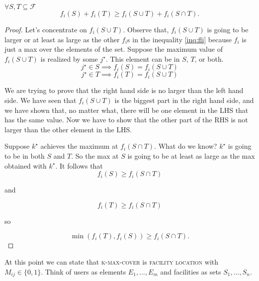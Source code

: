 \begin{claim}
 $\forall S, T \subseteq \mathcal{F}$
\begin{equation}\label{inq:fli}
f_i(S) + f_i(T) \geq f_i(S \cup T) + f_i(S \cap T).
\end{equation}	
\end{claim}
\begin{proof}
	Let's concentrate on $f_i(S \cup T)$. Observe that, $f_i(S \cup T)$ is going to be larger or at least as large as the other $f_i$s in the inequality \ref{inq:fli}  because $f_i$ is just a max over the elements of the set. Suppose the maximum value of $f_i(S \cup T)$ is realized by some $j^\star$. This element can be in $S$, $T$, or both.
	\begin{equation}
	j^\star\in S \implies f_i(S) = f_i(S \cup T)
	\end{equation}
\begin{equation}j^\star\in T \implies f_i(T) = f_i(S \cup T)\end{equation}

We are trying to prove that the right hand side is no larger than the left hand side. We have seen that $f_i(S \cup T)$ is the biggest part in the right hand side, and we have shown that, no matter what, there will be one element in the LHS that has the same value. Now we have to show that the other part of the RHS is not larger than the other element in the LHS.

Suppose $k^\star$ achieves the maximum at $f_i(S \cap T)$. What do we know? $k^\star$ is going to be in both $S$ and $T$. So the max at $S$ is going to be at least as large as the max obtained with $k^\star$. It follows that
\begin{equation}
 f_i(S) \geq f_i(S \cap T)
\end{equation}

and

\begin{equation}
f_i(T) \geq f_i(S \cap T)
\end{equation}

so

\begin{equation}
\min(f_i(T), f_i(S)) \geq f_i(S \cap T).
\end{equation}
\end{proof}

At this point we can state that \textsc{k-max-cover} is \textsc{facility location} with $M_{ij} \in \{0, 1\}$. Think of users as elements $E_1,\ldots, E_m$ and facilities as sets $S_1,\ldots, S_n$.

